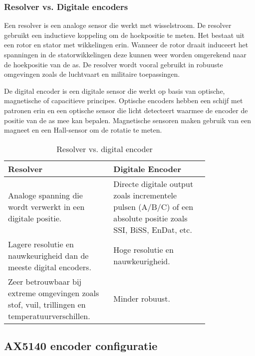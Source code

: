\subsubsection{Resolver vs. Digitale encoders}

Een resolver is een analoge sensor die werkt met wisselstroom. De resolver gebruikt een inductieve koppeling om de hoekpositie te meten. Het bestaat uit een rotor en stator met wikkelingen erin. Wanneer de rotor draait induceert het spanningen in de statorwikkelingen deze kunnen weer worden omgerekend naar de hoekpositie van de as. De resolver wordt vooral gebruikt in robuuste omgevingen zoals de luchtvaart en militaire toepassingen.

\vspace{0.5cm}

De digital encoder is een digitale sensor die werkt op basis van optische, magnetische of capacitieve principes. Optische encoders hebben een schijf met patronen erin en een optische sensor die licht detecteert waarmee de encoder de positie van de as mee kan bepalen. Magnetische sensoren maken gebruik van een magneet en een Hall-sensor om de rotatie te meten. \cite{web:EncodervsResolver}

\begin{table}[H]
	\caption{Resolver vs. digital encoder}
	\label{tab:ResolvervsDigital}
	\centering
	\begin{tabular}{|p{0.4\linewidth}|p{0.4\linewidth}|}
		\hline
		\textbf{Resolver} & \textbf{Digitale Encoder} \\
		\hline
		Analoge spanning die wordt verwerkt in een digitale positie. & Directe digitale output zoals incrementele pulsen (A/B/C) of een absolute positie zoals \gls{SSI}, BiSS, EnDat, etc. \\
		Lagere resolutie en nauwkeurigheid dan de meeste digital encoders. & Hoge resolutie en nauwkeurigheid. \\
		Zeer betrouwbaar bij extreme omgevingen zoals stof, vuil, trillingen en temperatuurverschillen. & Minder robuust. \\
		\hline
	\end{tabular}
\end{table}

\newpage

\subsection{AX5140 encoder configuratie}

